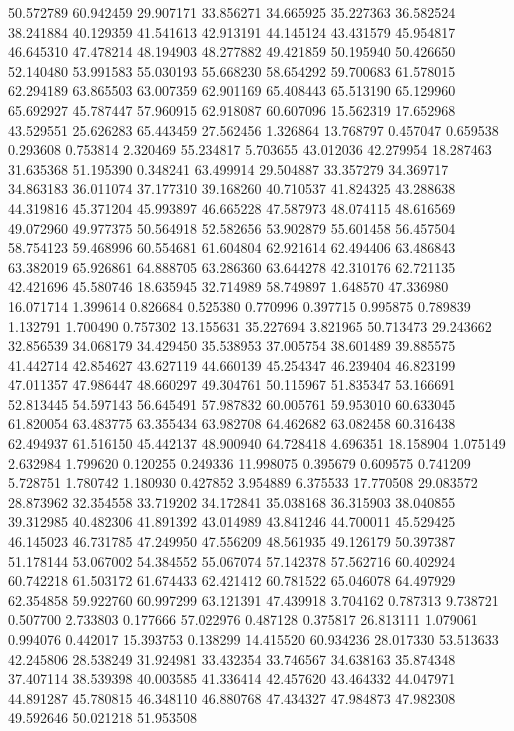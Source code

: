 50.572789
60.942459
29.907171
33.856271
34.665925
35.227363
36.582524
38.241884
40.129359
41.541613
42.913191
44.145124
43.431579
45.954817
46.645310
47.478214
48.194903
48.277882
49.421859
50.195940
50.426650
52.140480
53.991583
55.030193
55.668230
58.654292
59.700683
61.578015
62.294189
63.865503
63.007359
62.901169
65.408443
65.513190
65.129960
65.692927
45.787447
57.960915
62.918087
60.607096
15.562319
17.652968
43.529551
25.626283
65.443459
27.562456
1.326864
13.768797
0.457047
0.659538
0.293608
0.753814
2.320469
55.234817
5.703655
43.012036
42.279954
18.287463
31.635368
51.195390
0.348241
63.499914
29.504887
33.357279
34.369717
34.863183
36.011074
37.177310
39.168260
40.710537
41.824325
43.288638
44.319816
45.371204
45.993897
46.665228
47.587973
48.074115
48.616569
49.072960
49.977375
50.564918
52.582656
53.902879
55.601458
56.457504
58.754123
59.468996
60.554681
61.604804
62.921614
62.494406
63.486843
63.382019
65.926861
64.888705
63.286360
63.644278
42.310176
62.721135
42.421696
45.580746
18.635945
32.714989
58.749897
1.648570
47.336980
16.071714
1.399614
0.826684
0.525380
0.770996
0.397715
0.995875
0.789839
1.132791
1.700490
0.757302
13.155631
35.227694
3.821965
50.713473
29.243662
32.856539
34.068179
34.429450
35.538953
37.005754
38.601489
39.885575
41.442714
42.854627
43.627119
44.660139
45.254347
46.239404
46.823199
47.011357
47.986447
48.660297
49.304761
50.115967
51.835347
53.166691
52.813445
54.597143
56.645491
57.987832
60.005761
59.953010
60.633045
61.820054
63.483775
63.355434
63.982708
64.462682
63.082458
60.316438
62.494937
61.516150
45.442137
48.900940
64.728418
4.696351
18.158904
1.075149
2.632984
1.799620
0.120255
0.249336
11.998075
0.395679
0.609575
0.741209
5.728751
1.780742
1.180930
0.427852
3.954889
6.375533
17.770508
29.083572
28.873962
32.354558
33.719202
34.172841
35.038168
36.315903
38.040855
39.312985
40.482306
41.891392
43.014989
43.841246
44.700011
45.529425
46.145023
46.731785
47.249950
47.556209
48.561935
49.126179
50.397387
51.178144
53.067002
54.384552
55.067074
57.142378
57.562716
60.402924
60.742218
61.503172
61.674433
62.421412
60.781522
65.046078
64.497929
62.354858
59.922760
60.997299
63.121391
47.439918
3.704162
0.787313
9.738721
0.507700
2.733803
0.177666
57.022976
0.487128
0.375817
26.813111
1.079061
0.994076
0.442017
15.393753
0.138299
14.415520
60.934236
28.017330
53.513633
42.245806
28.538249
31.924981
33.432354
33.746567
34.638163
35.874348
37.407114
38.539398
40.003585
41.336414
42.457620
43.464332
44.047971
44.891287
45.780815
46.348110
46.880768
47.434327
47.984873
47.982308
49.592646
50.021218
51.953508
